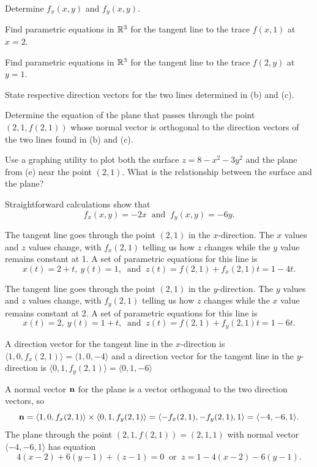 \begin{exercises}
    \ba
   	\item Determine $f_x(x,y)$ and $f_y(x,y)$.
	\item Find parametric equations in $\mathbb{R}^3$ for the tangent line to the trace $f(x,1)$ at $x=2$.
	\item Find parametric equations in $\mathbb{R}^3$ for the tangent line to the trace $f(2,y)$ at $y=1$.
	\item State respective direction vectors for the two lines determined in (b) and (c).
	\item Determine the equation of the plane that passes through the point $(2,1,f(2,1))$ whose normal vector is orthogonal to the direction vectors of the two lines found in (b) and (c).
	\item Use a graphing utility to plot both the surface $z = 8 - x^2 - 3y^2$ and the plane from (e) near the point $(2,1)$.  What is the relationship between the surface and the plane?
    \ea

\begin{exerciseSolution}
    \ba
   	\item Straightforward calculations show that 
\[f_x(x,y) = -2x \ \text{ and } \ f_y(x,y) = -6y.\]

	\item The tangent line goes through the point $(2,1)$ in the $x$-direction. The $x$ values and $z$ values change, with $f_x(2,1)$ telling us how $z$ changes while the $y$ value remains constant at 1. A set of parametric equations for this line is
\[x(t) = 2+t, \ y(t)=1, \ \text{ and } \ z(t) = f(2,1) + f_x(2,1)t = 1-4t.\]

	\item The tangent line goes through the point $(2,1)$ in the $y$-direction. The $y$ values and $z$ values change, with $f_y(2,1)$ telling us how $z$ changes while the $x$ value remains constant at 2. A set of parametric equations for this line is
\[x(t) = 2, \ y(t)=1+t, \ \text{ and } \ z(t) = f(2,1) + f_y(2,1)t = 1-6t.\]

	\item A direction vector for the tangent line in the $x$-direction is $\langle 1, 0, f_x(2,1) \rangle = \langle 1, 0, -4 \rangle$ and a direction vector for the tangent line in the $y$-direction is $\langle 0, 1, f_y(2,1) \rangle = \langle 0, 1, -6 \rangle$

	\item A normal vector $\mathbf{n}$ for the plane is a vector orthogonal to the two direction vectors, so 
\[\mathbf{n} = \langle 1, 0, f_x(2,1) \rangle \times \langle 0, 1, f_y(2,1) \rangle = \langle -f_x(2,1), -f_y(2,1), 1 \rangle = \langle -4, -6, 1 \rangle.\]
The plane through the point $(2,1,f(2,1)) = (2,1,1)$ with normal vector $\langle -4, -6, 1 \rangle$ has equation
\[4(x-2)+6(y-1)+(z-1) = 0 \ \text{ or } \ z = 1 - 4(x-2) - 6(y-1).\]


\end{exerciseSolution}
\end{exercises}
